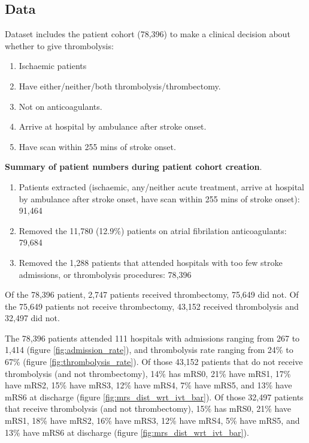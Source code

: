 \subsection{Data}

Dataset includes the patient cohort (78,396) to make a clinical decision about whether to give thrombolysis:
\begin{enumerate}
    \item Ischaemic patients
    \item Have either/neither/both thrombolysis/thrombectomy.
    \item Not on anticoagulants.
    \item Arrive at hospital by ambulance after stroke onset.
    \item Have scan within 255 mins of stroke onset.
\end{enumerate}

\textbf{Summary of patient numbers during patient cohort creation}.
\begin{enumerate}
    \item Patients extracted (ischaemic, any/neither acute treatment, arrive at hospital by ambulance after stroke onset, have scan within 255 mins of stroke onset): 91,464
    \item Removed the 11,780 (12.9\%) patients on atrial fibrilation anticoagulants: 79,684
    \item Removed the 1,288 patients that attended hospitals with too few stroke admissions, or thrombolysis procedures: 78,396
\end{enumerate}
Of the 78,396 patient, 2,747 patients received thrombectomy, 75,649 did not.
Of the 75,649 patients not receive thrombectomy, 43,152 received thrombolysis and 32,497 did not.

The 78,396 patients attended 111 hospitals with admissions ranging from 267 to 1,414 (figure \ref{fig:admission_rate}), and thrombolysis rate ranging from 24\% to 67\%  (figure \ref{fig:thrombolysis_rate}). Of those 43,152 patients that do not receive thrombolysis (and not thrombectomy), 14\% has mRS0, 21\% have mRS1, 17\% have mRS2, 15\% have mRS3, 12\% have mRS4, 7\% have mRS5, and 13\% have mRS6 at discharge (figure \ref{fig:mrs_dist_wrt_ivt_bar}). Of those 32,497 patients that receive thrombolysis (and not thrombectomy), 15\% has mRS0, 21\% have mRS1, 18\% have mRS2, 16\% have mRS3, 12\% have mRS4, 5\% have mRS5, and 13\% have mRS6 at discharge (figure \ref{fig:mrs_dist_wrt_ivt_bar}).



